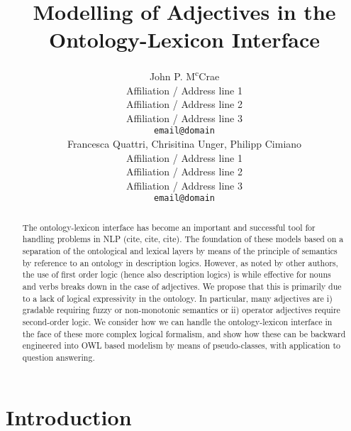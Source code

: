 \documentclass[11pt]{article}
\title{Modelling of Adjectives in the Ontology-Lexicon Interface}
\author{John P. M\textsuperscript{c}Crae \\
  Affiliation / Address line 1 \\
  Affiliation / Address line 2 \\
  Affiliation / Address line 3 \\
  {\tt email@domain} \\\And
  Francesca Quattri, Chrisitina Unger, Philipp Cimiano \\
  Affiliation / Address line 1 \\
  Affiliation / Address line 2 \\
  Affiliation / Address line 3 \\
  {\tt email@domain} \\}
\date{}
\begin{document}
\maketitle
\begin{abstract}
    The ontology-lexicon interface has become an important and successful tool for handling problems in NLP (cite, cite, cite). The foundation of these models based on a separation of the ontological and lexical layers by means of the principle of semantics by reference to an ontology in description logics. However, as noted by other authors, the use of first order logic (hence also description logics) is while effective for nouns and verbs breaks down in the case of adjectives. We propose that this is primarily due to a lack of logical expressivity in the ontology. In particular, many adjectives are i) gradable requiring fuzzy or non-monotonic semantics or ii) operator adjectives require second-order logic. We consider  how we can handle the ontology-lexicon interface in the face of these more complex logical formalism, and show how these can be backward engineered into OWL based modelism by means of pseudo-classes, with application to question answering.
\end{abstract}



\section{Introduction}
\label{intro}
\end{document}
